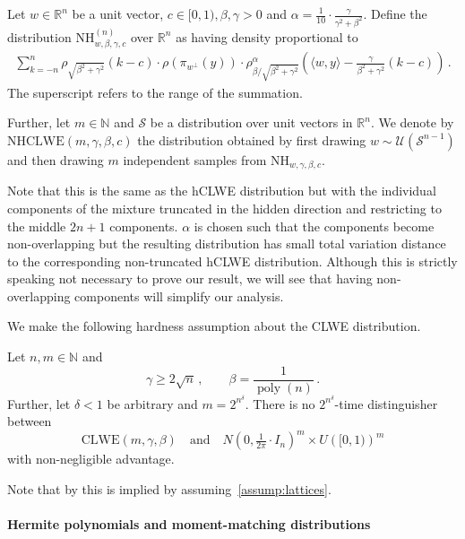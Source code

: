 \documentclass{theoretics}
\newcommand{\Paren}[1]{\left(#1\right)}
\newcommand{\iprod}[1]{\langle#1\rangle}
\DeclareMathOperator{\poly}{poly}
\newcommand{\N}{\mathbb N}
\newcommand{\R}{\mathbb R}
\newcommand{\cS}{\mathcal S}
\newcommand{\cU}{\mathcal U}
\renewcommand{\geq}{\geqslant}
\newcommand{\nhclwed}[4]{\mathrm{NH}_{#1,#2,#3,#4}}
\newcommand{\clwem}[3]{\mathrm{CLWE}\Paren{#1,#2,#3}}
\newcommand{\nhclwem}[4]{\mathrm{NHCLWE}\Paren{#1,#2,#3,#4}}
\begin{document}
\begin{definition}
    Let $w \in \R^n$ be a unit vector, $c \in [0,1), \beta, \gamma > 0$ and $\alpha = \frac 1 {10} \cdot \frac{\gamma}{\gamma^2 + \beta^2}$.
    Define the distribution $\nhclwed{w}{\beta}{\gamma}{c}^{(n)}$ over $\R^n$ as having density proportional to
    \begin{align}
        \sum_{k = -n}^n \rho_{\sqrt{\beta^2 + \gamma^2}}(k - c) \cdot \rho\Paren{\pi_{{w}^\perp}(y)} \cdot \rho_{\beta / \sqrt{\beta^2 + \gamma^2}}^\alpha\Paren{\iprod{w, y} - \tfrac{\gamma}{\beta^2 + \gamma^2}\Paren{k - c} }\,. \label{eq:nhclwe}
    \end{align}
    The superscript refers to the range of the summation.

    Further, let $m \in\N$ and $\cS$ be a distribution over unit vectors in $\R^n$.
    We denote by $\nhclwem{m}{\gamma}{\beta}{c}$ the distribution obtained by first drawing $w \sim \cU(\cS^{n-1})$ and then drawing $m$ independent samples from $\nhclwed{w}{\gamma}{\beta}{c}$.
\end{definition}

Note that this is the same as the hCLWE distribution but with the individual components of the mixture truncated in the hidden direction and restricting to the middle $2n+1$ components.
$\alpha$ is chosen such that the components become non-overlapping but the resulting distribution has small total variation distance to the corresponding non-truncated hCLWE distribution.
Although this is strictly speaking not necessary to prove our result, we will see that having non-overlapping components will simplify our analysis.

We make the following hardness assumption about the CLWE distribution.
\begin{assumption}
    \label{assump:disting_clwe}
    Let $n, m \in \N$ and \[\gamma \geq 2\sqrt{n}\,,\quad\quad \beta = \frac 1 {\poly\Paren{n}}\,.\]
    Further, let $\delta < 1$ be arbitrary and $m = 2^{n^\delta}$.
    There is no $2^{n^\delta}$-time distinguisher between \[\clwem{m}{\gamma}{\beta} \quad\text{and}\quad N\Paren{0, \tfrac 1 {2\pi} \cdot I_n}^m \times U\Paren{[0,1)}^m\] with non-negligible advantage.
\end{assumption}

Note that by \cite[Corollary 3.2]{CLWE} this is implied by assuming~\cref{assump:lattices}.

\paragraph{Hermite polynomials and moment-matching distributions}
\end{document}
